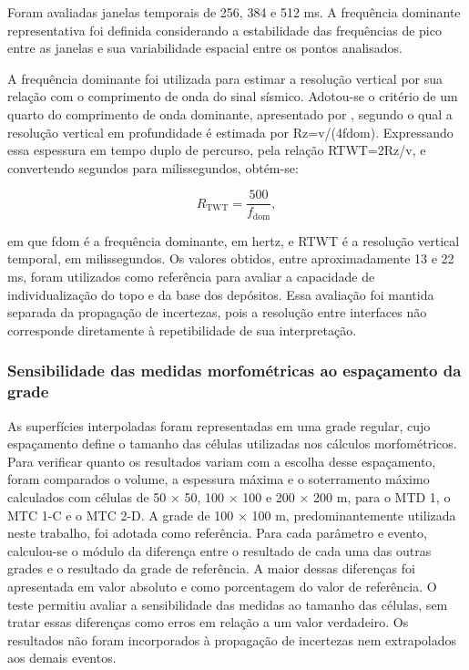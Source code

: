 Foram avaliadas janelas temporais de 256, 384 e 512 ms. A frequência dominante representativa foi definida considerando a estabilidade das frequências de pico entre as janelas e sua variabilidade espacial entre os pontos analisados.

A frequência dominante foi utilizada para estimar a resolução vertical por sua relação com o comprimento de onda do sinal sísmico. Adotou-se o critério de um quarto do comprimento de onda dominante, apresentado por , segundo o qual a resolução vertical em profundidade é estimada por Rz=v/(4fdom). Expressando essa espessura em tempo duplo de percurso, pela relação RTWT=2Rz/v, e convertendo segundos para milissegundos, obtém-se:

\begin{equation}
  R_{\mathrm{TWT}}=\frac{500}{f_{\mathrm{dom}}},
  \label{eq:resolucao-vertical}
\end{equation}

\noindent
em que fdom é a frequência dominante, em hertz, e RTWT é a resolução vertical temporal, em milissegundos. Os valores obtidos, entre aproximadamente 13 e 22 ms, foram utilizados como referência para avaliar a capacidade de individualização do topo e da base dos depósitos. Essa avaliação foi mantida separada da propagação de incertezas, pois a resolução entre interfaces não corresponde diretamente à repetibilidade de sua interpretação.

\subsubsection{Sensibilidade das medidas morfométricas ao espaçamento da grade}\label{sec:4-3-9-4}

As superfícies interpoladas foram representadas em uma grade regular, cujo espaçamento define o tamanho das células utilizadas nos cálculos morfométricos. Para verificar quanto os resultados variam com a escolha desse espaçamento, foram comparados o volume, a espessura máxima e o soterramento máximo calculados com células de 50 × 50, 100 × 100 e 200 × 200 m, para o MTD 1, o MTC 1-C e o MTC 2-D. A grade de 100 × 100 m, predominantemente utilizada neste trabalho, foi adotada como referência. Para cada parâmetro e evento, calculou-se o módulo da diferença entre o resultado de cada uma das outras grades e o resultado da grade de referência. A maior dessas diferenças foi apresentada em valor absoluto e como porcentagem do valor de referência. O teste permitiu avaliar a sensibilidade das medidas ao tamanho das células, sem tratar essas diferenças como erros em relação a um valor verdadeiro. Os resultados não foram incorporados à propagação de incertezas nem extrapolados aos demais eventos.

